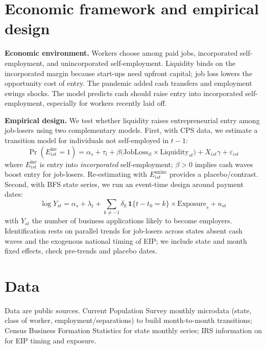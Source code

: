 \section{ Economic framework and empirical design}

\noindent \textbf{Economic environment.} Workers choose among paid jobs, incorporated self-employment, and unincorporated self-employment. Liquidity binds on the incorporated margin because start-ups need upfront capital; job loss lowers the opportunity cost of entry. The pandemic added cash transfers and employment swings shocks. The model predicts cash should raise entry into incorporated self-employment, especially for workers recently laid off.


\noindent\textbf{Empirical design.} We test whether liquidity raises entrepreneurial entry among job-losers using two complementary models. First, with CPS data, we estimate a transition model for individuals not self-employed in $t\!-\!1$:
\begin{equation*}
	\Pr(E^{\mathrm{inc}}_{ist}=1)=\alpha_s+\tau_t+\beta\big(\text{JobLoss}_{it}\times \text{Liquidity}_{st}\big)+X_{ist}\gamma+\varepsilon_{ist}
\end{equation*}
where $E^{\mathrm{inc}}_{ist}$ is entry into \emph{incorporated} self-employment; $\beta>0$ implies cash waves boost entry for job-losers. Re-estimating with $E^{\mathrm{uninc}}_{ist}$ provides a placebo/contrast. Second, with BFS state series, we run an event-time design around payment dates:
\begin{equation*}
	\log Y_{st}=\alpha_s+\lambda_t+\sum_{k\neq -1}\delta_k\,\mathbf{1}\{t-t_0=k\}\times \text{Exposure}_s+u_{st}
\end{equation*}
with $Y_{st}$ the number of business applications likely to become employers. Identification rests on parallel trends for job-losers across states absent cash waves and the exogenous national timing of EIP; we include state and month fixed effects, check pre-trends and placebo dates.

\section{ Data}

\noindent Data are public sources. Current Population Survey monthly microdata (state, class of worker, employment/separations) to build month-to-month transitions; Census Business Formation Statistics for state monthly series; IRS information on for EIP timing and exposure.



\singlespacing

%

\pagebreak
\renewcommand*{\thepage}{A.\arabic{page}}
\setcounter{page}{0}
\setcounter{equation}{0}
\renewcommand{\theequation}{A.\arabic{equation}}
\setcounter{section}{0}
\renewcommand{\thesection}{A.\arabic{section}}
\renewcommand{\thefigure}{A.\arabic{figure}}
\setcounter{figure}{0}
\renewcommand{\thetable}{A.\arabic{table}}
\setcounter{table}{0}
\thispagestyle{empty}


